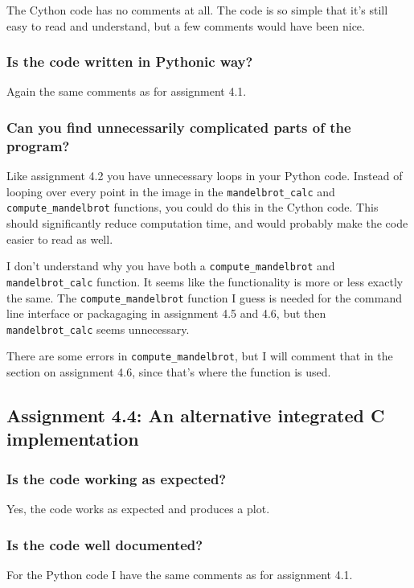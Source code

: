 \documentclass[a4paper]{article}
\begin{document}
The Cython code has no comments at all. The code is so simple that it's still easy to read and understand, but a few comments would have been nice.

\subsubsection*{Is the code written in Pythonic way?}
Again the same comments as for assignment 4.1.


\subsubsection*{Can you find unnecessarily complicated parts of the program?}

Like assignment 4.2 you have unnecessary loops in your Python code. Instead of looping over every point in the image in the \texttt{mandelbrot\_calc} and \texttt{compute\_mandelbrot} functions, you could do this in the Cython code. This should significantly reduce computation time, and would probably make the code easier to read as well.

I don't understand why you have both a \texttt{compute\_mandelbrot} and \texttt{mandelbrot\_calc} function. It seems like the functionality is more or less exactly the same. The \texttt{compute\_mandelbrot} function I guess is needed for the command line interface or packagaging in assignment 4.5 and 4.6, but then \texttt{mandelbrot\_calc} seems unnecessary.

There are some errors in \texttt{compute\_mandelbrot}, but I will comment that in the section on assignment 4.6, since that's where the function is used.


\subsection*{Assignment 4.4:  An alternative integrated C implementation}

\subsubsection*{Is the code working as expected?}
Yes, the code works as expected and produces a plot.

\subsubsection*{Is the code well documented?}
For the Python code I have the same comments as for assignment 4.1.
\end{document}
